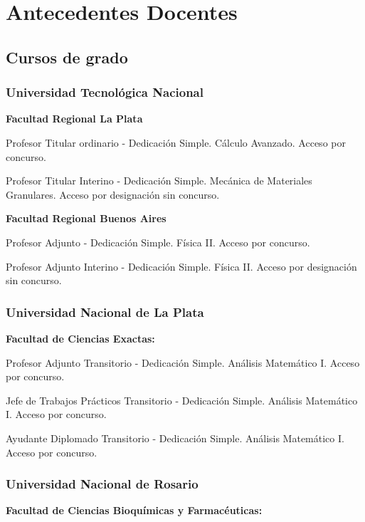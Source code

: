 \section{Antecedentes Docentes}

\subsection{Cursos de grado}

\subsubsection{Universidad Tecnológica Nacional}

\textbf{Facultad Regional La Plata}

 Profesor Titular ordinario - Dedicación Simple. Cálculo Avanzado. Acceso por concurso.

 Profesor Titular Interino - Dedicación Simple. Mecánica de Materiales Granulares. Acceso por designación sin concurso.

\textbf{Facultad Regional Buenos Aires}

 Profesor Adjunto - Dedicación Simple. Física II. Acceso por concurso.

 Profesor Adjunto Interino - Dedicación Simple. Física II. Acceso por designación sin concurso.

\subsubsection{Universidad Nacional de La Plata}
  
\textbf{Facultad de Ciencias Exactas:}
 
 Profesor Adjunto Transitorio - Dedicación Simple. Análisis Matemático I. Acceso por concurso.

 Jefe de Trabajos Prácticos Transitorio - Dedicación Simple. Análisis Matemático I. Acceso por concurso.

 Ayudante Diplomado Transitorio - Dedicación Simple. Análisis Matemático I. Acceso por concurso.

\subsubsection{Universidad Nacional de Rosario}
  
\textbf{Facultad de Ciencias Bioquímicas y Farmacéuticas:} 

